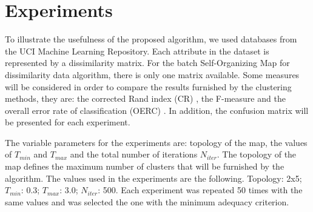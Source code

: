 \documentclass[10pt, conference, compsocconf]{IEEEtran}
\begin{document}
\section{Experiments}\label{sec:experiments}

To illustrate the usefulness of the proposed algorithm, we used databases from the UCI Machine Learning Repository. Each attribute in the dataset is represented by a dissimilarity matrix. For the batch Self-Organizing Map for dissimilarity data algorithm, there is only one matrix available. Some measures will be considered in order to compare the results furnished by the clustering methods, they are: the corrected Rand index (CR) \cite{Hubert:1985}, the F-measure \cite{Rijsbergen:1979} and the overall error rate of classification (OERC) \cite{Breiman:1984}. In addition, the confusion matrix will be presented for each experiment. 


The variable parameters for the experiments are: topology of the map, the values of $T_{min}$ and $T_{max}$ and the total number of iterations $N_{iter}$. The topology of the map defines the maximum number of clusters that will be furnished by the algorithm. 
The values used in the experiments are the following. Topology: 2x5; $T_{min}$: 0.3; $T_{max}$: 3.0; $N_{iter}$: 500.
Each experiment was repeated 50 times with the same values and was selected the one with the minimum adequacy criterion.

\end{document}
